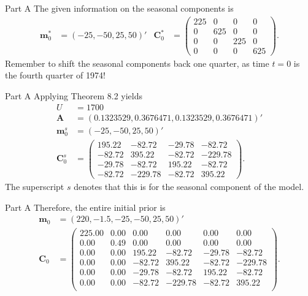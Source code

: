 \documentclass[14pt]{beamer}
\newcommand{\bm}{\mathbf{m}}
\newcommand{\bC}{\mathbf{C}}
\newcommand{\bA}{\mathbf{A}}
\begin{document}
	\begin{frame}{Part A}
		The given information on the seasonal components is
		\begin{align*}
		\bm_0^* & = (-25,-50,25,50)' &
		\bC_0^* & = \begin{pmatrix}
		225 & 0 & 0 & 0 \\
		0 & 625 & 0 & 0 \\
		0 & 0 & 225 & 0 \\
		0 & 0 & 0 & 625
		\end{pmatrix}.
		\end{align*}
		Remember to shift the seasonal components back one quarter, as time $t=0$ is the fourth quarter of 1974!
	\end{frame}

	\begin{frame}{Part A}
		Applying Theorem 8.2 yields
		\begin{align*}
		U & = 1700 \\ \bA & = (0.1323529, 0.3676471, 0.1323529, 0.3676471)' \\
		\bm_0^s & = (-25,-50,25,50)' \\
		\bC_0^s & = \begin{pmatrix}
		195.22 & -82.72 & -29.78 & -82.72 \\ 
		-82.72 & 395.22 & -82.72 & -229.78 \\ 
		-29.78 & -82.72 & 195.22 & -82.72 \\ 
		-82.72 & -229.78 & -82.72 & 395.22 
		\end{pmatrix}.
		\end{align*}
		The superscript $s$ denotes that this is for the seasonal component of the model.
	\end{frame}

	\begin{frame}{Part A}
		Therefore, the entire initial prior is
			{\footnotesize \begin{align*}
		\bm_0 & = (220,-1.5, -25, -50,  25,  50)' \\
		\bC_0 & = \begin{pmatrix}
		225.00 & 0.00 & 0.00 & 0.00 & 0.00 & 0.00 \\ 
		0.00 & 0.49 & 0.00 & 0.00 & 0.00 & 0.00 \\ 
		0.00 & 0.00 & 195.22 & -82.72 & -29.78 & -82.72 \\ 
		0.00 & 0.00 & -82.72 & 395.22 & -82.72 & -229.78 \\ 
		0.00 & 0.00 & -29.78 & -82.72 & 195.22 & -82.72 \\ 
		0.00 & 0.00 & -82.72 & -229.78 & -82.72 & 395.22 \\ 
		\end{pmatrix}.
		\end{align*}}
	\end{frame}
\end{document}
